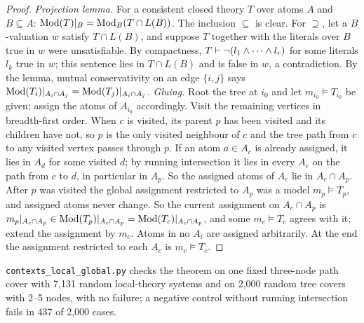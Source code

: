 \begin{proof}
\emph{Projection lemma.} For a consistent closed theory $T$ over atoms $A$ and $B\subseteq A$: $\mathrm{Mod}(T)|_B=\mathrm{Mod}_B(T\cap L(B))$. The inclusion $\subseteq$ is clear. For $\supseteq$, let a $B$-valuation $w$ satisfy $T\cap L(B)$, and suppose $T$ together with the literals over $B$ true in $w$ were unsatisfiable. By compactness, $T\vdash\neg(l_1\wedge\dots\wedge l_r)$ for some literals $l_k$ true in $w$; this sentence lies in $T\cap L(B)$ and is false in $w$, a contradiction.
By the lemma, mutual conservativity on an edge $\{i,j\}$ says $\mathrm{Mod}(T_i)|_{A_i\cap A_j}=\mathrm{Mod}(T_j)|_{A_i\cap A_j}$.
\emph{Gluing.} Root the tree at $i_0$ and let $m_{i_0}\models T_{i_0}$ be given; assign the atoms of $A_{i_0}$ accordingly. Visit the remaining vertices in breadth-first order. When $c$ is visited, its parent $p$ has been visited and its children have not, so $p$ is the only visited neighbour of $c$ and the tree path from $c$ to any visited vertex passes through $p$. If an atom $a\in A_c$ is already assigned, it lies in $A_d$ for some visited $d$; by running intersection it lies in every $A_e$ on the path from $c$ to $d$, in particular in $A_p$. So the assigned atoms of $A_c$ lie in $A_c\cap A_p$. After $p$ was visited the global assignment restricted to $A_p$ was a model $m_p\models T_p$, and assigned atoms never change. So the current assignment on $A_c\cap A_p$ is $m_p|_{A_c\cap A_p}\in\mathrm{Mod}(T_p)|_{A_c\cap A_p}=\mathrm{Mod}(T_c)|_{A_c\cap A_p}$, and some $m_c\models T_c$ agrees with it; extend the assignment by $m_c$. Atoms in no $A_i$ are assigned arbitrarily. At the end the assignment restricted to each $A_c$ is $m_c\models T_c$.
\end{proof}

\texttt{contexts\_local\_global.py} checks the theorem on one fixed three-node path cover with 7{,}131 random local-theory systems and on 2{,}000 random tree covers with 2--5 nodes, with no failure; a negative control without running intersection fails in 437 of 2{,}000 cases.

